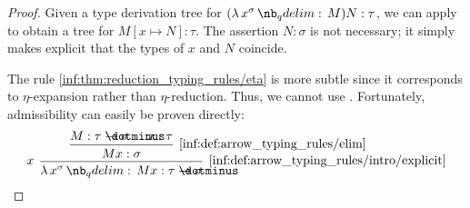 \begin{proof}
  Given a type derivation tree for \( (\qabs {x^\sigma} M) N: \tau \), we can apply  to obtain a tree for \( M[x \mapsto N]: \tau \). The assertion \( N: \sigma \) is not necessary; it simply makes explicit that the types of \( x \) and \( N \) coincide.

  The rule \ref{inf:thm:reduction_typing_rules/eta} is more subtle since it corresponds to \( \eta \)-expansion rather than \( \eta \)-reduction. Thus, we cannot use . Fortunately, admissibility can easily be proven directly:
  \begin{equation*}
    \begin{prooftree}
      \hypo{ M: \tau \synimplies \sigma }
      \hypo{ x: \tau }
      \infer2[\ref{inf:def:arrow_typing_rules/elim}]{ Mx: \sigma }

      \infer[left label=\( x \)]1[\ref{inf:def:arrow_typing_rules/intro/explicit}]{ \qabs {x^\sigma} Mx: \tau \synimplies \sigma }
    \end{prooftree}
  \end{equation*}
\end{proof}

